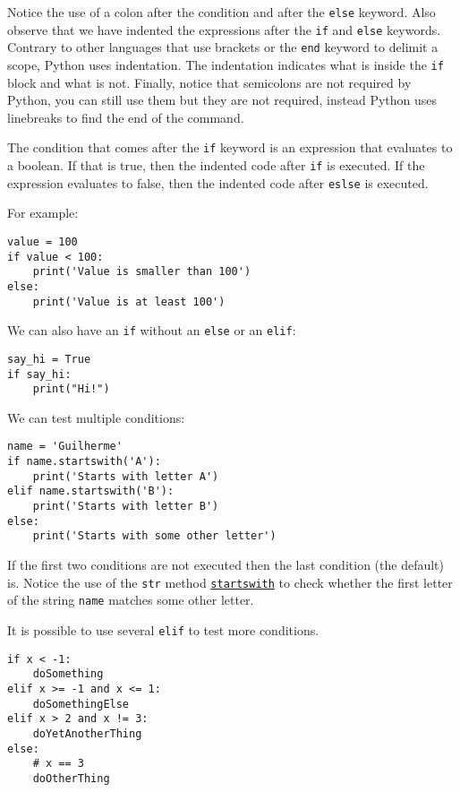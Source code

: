 \documentclass[12pt, a4paper]{article}
\begin{document}
Notice the use of a colon after the condition and after the \texttt{else} keyword.
Also observe that we have indented the expressions after the \texttt{if} and \texttt{else} keywords.
Contrary to other languages that use brackets or the \texttt{end} keyword to delimit a scope, Python uses indentation.
The indentation indicates what is inside the \texttt{if} block and what is not.
Finally, notice that semicolons are not required by Python, you can still use them but they are not required, instead Python uses linebreaks to find the end of the command.

The condition that comes after the \texttt{if} keyword is an expression that evaluates to a boolean. If that is true, then the indented code after \texttt{if}  is executed. If the expression evaluates to false, then the indented code after \texttt{eslse} is executed.

For example:
\lstset{language=jupyter-python,label= ,caption= ,captionpos=b,numbers=none}
\begin{lstlisting}
value = 100
if value < 100:
    print('Value is smaller than 100')
else:
    print('Value is at least 100')
\end{lstlisting}

We can also have an \texttt{if} without an \texttt{else} or an \texttt{elif}:
\lstset{language=jupyter-python,label= ,caption= ,captionpos=b,numbers=none}
\begin{lstlisting}
say_hi = True
if say_hi:
    print("Hi!")
\end{lstlisting}

We can test multiple conditions:
\lstset{language=jupyter-python,label= ,caption= ,captionpos=b,numbers=none}
\begin{lstlisting}
name = 'Guilherme'
if name.startswith('A'):
    print('Starts with letter A')
elif name.startswith('B'):
    print('Starts with letter B')
else:
    print('Starts with some other letter')
\end{lstlisting}
If the first two conditions are not executed then the last condition (the default) is.
Notice the use of the \texttt{str} method \href{https://docs.python.org/3.6/library/stdtypes.html?\#str.startswith}{\texttt{startswith}} to check whether the first letter of the string \texttt{name} matches some other letter.

It is possible to use several \texttt{elif} to test more conditions.
\lstset{language=jupyter-python,label= ,caption= ,captionpos=b,numbers=none}
\begin{lstlisting}
if x < -1:
    doSomething
elif x >= -1 and x <= 1:
    doSomethingElse
elif x > 2 and x != 3:
    doYetAnotherThing
else:
    # x == 3
    doOtherThing
\end{lstlisting}
\end{document}
